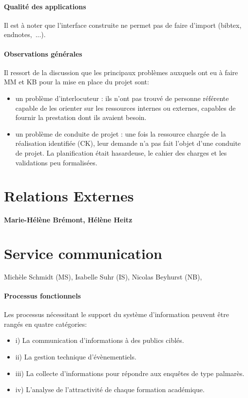 \documentclass{book}
\begin{document}
\paragraph{Qualité des applications}
Il est à noter que l'interface construite ne permet pas de faire d'import (bibtex, 
endnotes,~...). 


\paragraph{Observations générales}
Il ressort de la discussion que les principaux problèmes auxquels ont eu à 
faire MM et KB pour la mise en place du projet sont:
\begin{itemize}
\item un problème d'interlocuteur : ils n'ont pas trouvé de personne référente 
capable de les orienter sur les ressources internes ou externes, capables de fournir 
la prestation dont ils avaient besoin.
\item un problème de conduite de projet : une fois la ressource chargée de la 
réalisation identifiée (CK), leur demande n'a pas fait l'objet d'une conduite
de projet. La planification était hasardeuse, le cahier des charges et
les validations peu formalisées.
\end{itemize}




\section{Relations Externes}
\paragraph{Marie-Hélène Brémont, Hélène Heitz}

\section{Service communication}
Michèle Schmidt (MS), Isabelle Suhr (IS), Nicolas Beyhurst (NB),

\paragraph{Processus fonctionnels}
Les processus nécessitant le support du système d'information peuvent 
être rangés en quatre catégories:
\begin{itemize}
\item i) La communication d'informations à des publics ciblés.
\item ii) La gestion technique d'évènementiels.
\item iii) La collecte d'informations pour répondre aux enquêtes de type 
      palmarès.
\item iv) L'analyse de l'attractivité de chaque formation académique.
\end{itemize}
\bigskip
\end{document}
